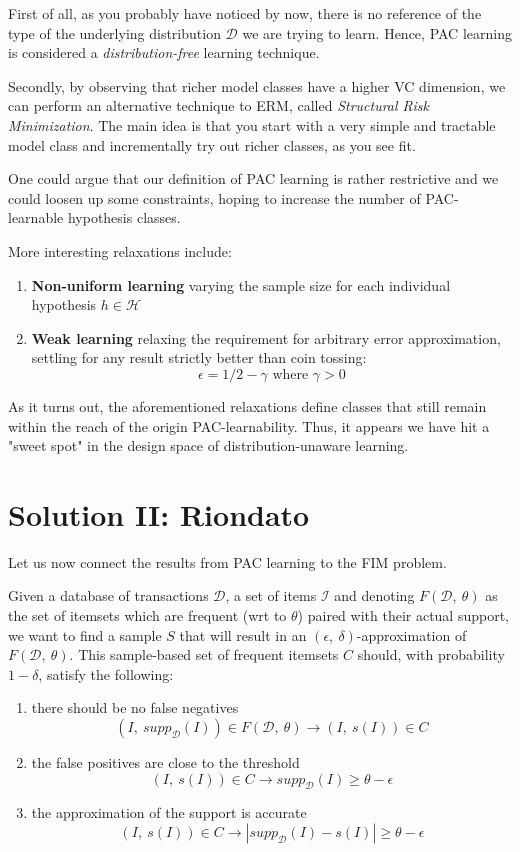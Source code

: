 \documentclass[11pt]{sigplanconf}
\renewcommand\it{\textit}
\renewcommand\bf{\textbf}
\newcommand\I{\mathcal{I}}
\renewcommand\H{\mathcal{H}}
\newcommand\D{\mathcal{D}}
\begin{document}
First of all, as you probably have noticed by now, there is no reference of the type of the underlying distribution $\D$ we are trying to learn. Hence, PAC learning is considered a \textit{distribution-free} learning technique.

Secondly, by observing that richer model classes have a higher VC dimension, we can perform an alternative technique to ERM, called \it{Structural Risk Minimization}. The main idea is that you start with a very simple and tractable model class and incrementally try out richer classes, as you see fit.

One could argue that our definition of PAC learning is rather restrictive and we could loosen up some constraints, hoping to increase the number of PAC-learnable hypothesis classes.

More interesting relaxations include:
\begin{enumerate}
\item \bf{Non-uniform learning} varying the sample size for each individual hypothesis $h \in \H$
\item \bf{Weak learning} relaxing the requirement for arbitrary error approximation, settling for any result strictly better than coin tossing:
\[ \epsilon = 1/2 - \gamma \text{ where } \gamma > 0
\]
\end{enumerate}
 
As it turns out, the aforementioned relaxations define classes that still remain within the reach of the origin PAC-learnability. Thus, it appears we have hit a "sweet spot" in the design space of distribution-unaware learning.

\section{Solution II: Riondato}
Let us now connect the results from PAC learning to the FIM problem.

Given a database of transactions $\D$, a set of items $\I$ and denoting $F(\D,\ \theta)$ as the set of itemsets which are frequent (wrt to $\theta$) paired with their actual support, we want to find a sample $S$ that will result in an $(\epsilon,\ \delta)$-approximation of $F(\D,\ \theta)$. This sample-based set of frequent itemsets $C$ should, with probability $1 - \delta$, satisfy the following:
\begin{enumerate}
\item there should be no false negatives
\[ (I,\ supp_{\D}(I)) \in F(\D,\ \theta) \longrightarrow (I,\ s(I))\in C
\]
\item the false positives are close to the threshold
\[ (I,\ s(I))\in C \longrightarrow supp_{\D}(I) \geq \theta - \epsilon
\]
\item the approximation of the support is accurate
\[ (I,\ s(I))\in C \longrightarrow |supp_{\D}(I) - s(I)| \geq \theta - \epsilon
\]
\end{enumerate}
\end{document}
